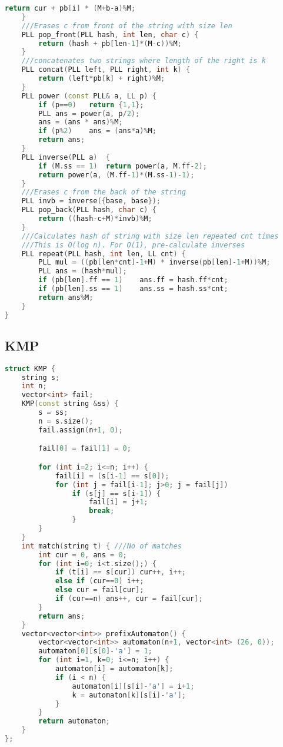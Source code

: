 \documentclass[10pt,a4paper,landscape]{article}
\begin{document}
\begin{multicols}{3}
\begin{lstlisting}[language=C++, breaklines=true]
        return cur + pb[i] * (M+b-a)%M;
    }
    ///Erases c from front of the string with size len
    PLL pop_front(PLL hash, int len, char c) {
        return (hash + pb[len-1]*(M-c))%M;
    }
    ///concatenates two strings where length of the right is k
    PLL concat(PLL left, PLL right, int k) {
        return (left*pb[k] + right)%M;
    }
    PLL power (const PLL& a, LL p) {
        if (p==0)   return {1,1};
        PLL ans = power(a, p/2);
        ans = (ans * ans)%M;
        if (p%2)    ans = (ans*a)%M;
        return ans;
    }
    PLL inverse(PLL a)  {
        if (M.ss == 1)  return power(a, M.ff-2);
        return power(a, (M.ff-1)*(M.ss-1)-1);
    }
    ///Erases c from the back of the string
    PLL invb = inverse({base, base});
    PLL pop_back(PLL hash, char c) {
        return ((hash-c+M)*invb)%M;
    }
    ///Calculates hash of string with size len repeated cnt times
    ///This is O(log n). For O(1), pre-calculate inverses
    PLL repeat(PLL hash, int len, LL cnt) {
        PLL mul = ((pb[len*cnt]-1+M) * inverse(pb[len]-1+M))%M;
        PLL ans = (hash*mul);
        if (pb[len].ff == 1)    ans.ff = hash.ff*cnt;
        if (pb[len].ss == 1)    ans.ss = hash.ss*cnt;
        return ans%M;
    }
}
\end{lstlisting}

\subsection{KMP}
\begin{lstlisting}[language=C++, breaklines=true]
struct KMP {
    string s;
    int n;
    vector<int> fail;
    KMP(const string &ss) {
        s = ss;
        n = s.size();
        fail.assign(n+1, 0);

        fail[0] = fail[1] = 0;

        for (int i=2; i<=n; i++) {
            fail[i] = (s[i-1] == s[0]);
            for (int j = fail[i-1]; j>0; j = fail[j])
                if (s[j] == s[i-1]) {
                    fail[i] = j+1;
                    break;
                }
        }
    }
    int match(string t) { ///No of matches
        int cur = 0, ans = 0;
        for (int i=0; i<t.size();) {
            if (t[i] == s[cur]) cur++, i++;
            else if (cur==0) i++;
            else cur = fail[cur];
            if (cur==n) ans++, cur = fail[cur];
        }
        return ans;
    }
    vector<vector<int>> prefixAutomaton() {
        vector<vector<int>> automaton(n+1, vector<int> (26, 0));
        automaton[0][s[0]-'a'] = 1;
        for (int i=1, k=0; i<=n; i++) {
            automaton[i] = automaton[k];
            if (i < n) {
                automaton[i][s[i]-'a'] = i+1;
                k = automaton[k][s[i]-'a'];
            }
        }
        return automaton;
    }
};
\end{lstlisting}


\end{multicols}
\end{document}
